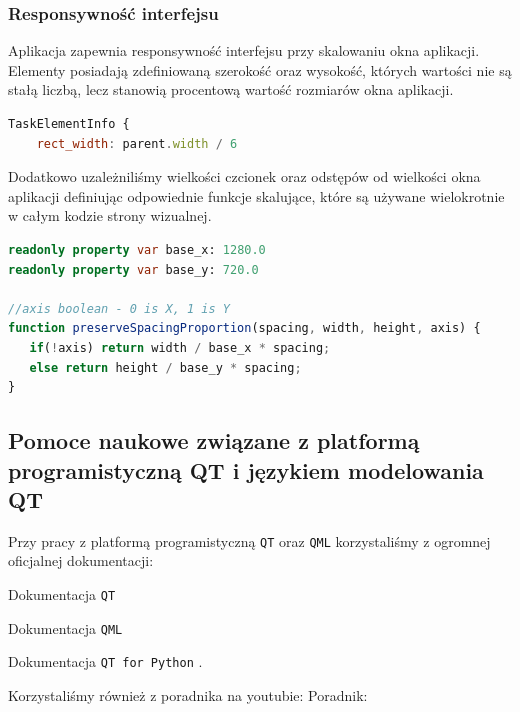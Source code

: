 \subsubsection{Responsywność interfejsu}
\label{sec:ResponsywnośćInterfejsu}
Aplikacja zapewnia responsywność interfejsu przy skalowaniu okna aplikacji. Elementy posiadają zdefiniowaną szerokość oraz wysokość, których wartości nie są stałą liczbą, lecz stanowią procentową wartość rozmiarów okna aplikacji.
\begin{lstlisting}[language=QML, caption={Przykładowy element o szerokości 1/6}]
TaskElementInfo {
    rect_width: parent.width / 6
\end{lstlisting}
Dodatkowo uzależniliśmy wielkości czcionek oraz odstępów od wielkości okna aplikacji definiując odpowiednie funkcje skalujące, które są używane wielokrotnie w całym kodzie strony wizualnej.
\begin{lstlisting}[language=QML, caption={Funkcja skalująca odstępy}]
readonly property var base_x: 1280.0
readonly property var base_y: 720.0
    
//axis boolean - 0 is X, 1 is Y
function preserveSpacingProportion(spacing, width, height, axis) {
   if(!axis) return width / base_x * spacing;
   else return height / base_y * spacing;
}
\end{lstlisting}

\subsection{Pomoce naukowe związane z platformą programistyczną QT i językiem modelowania QT}
\label{sec:PomoceNaukoweQML}
Przy pracy z platformą programistyczną \texttt{QT} oraz \texttt{QML} korzystaliśmy z ogromnej oficjalnej dokumentacji: 
\par
Dokumentacja \texttt{QT} \cite{DokumentacjaQT}
\par
Dokumentacja \texttt{QML} \cite{DokumentacjaQML}
\par
Dokumentacja \texttt{QT for Python} \cite{DokumentacjaQtForPython}.
\par
Korzystaliśmy również z poradnika na youtubie:
Poradnik: \cite{PoradnikQMLYoutube}

